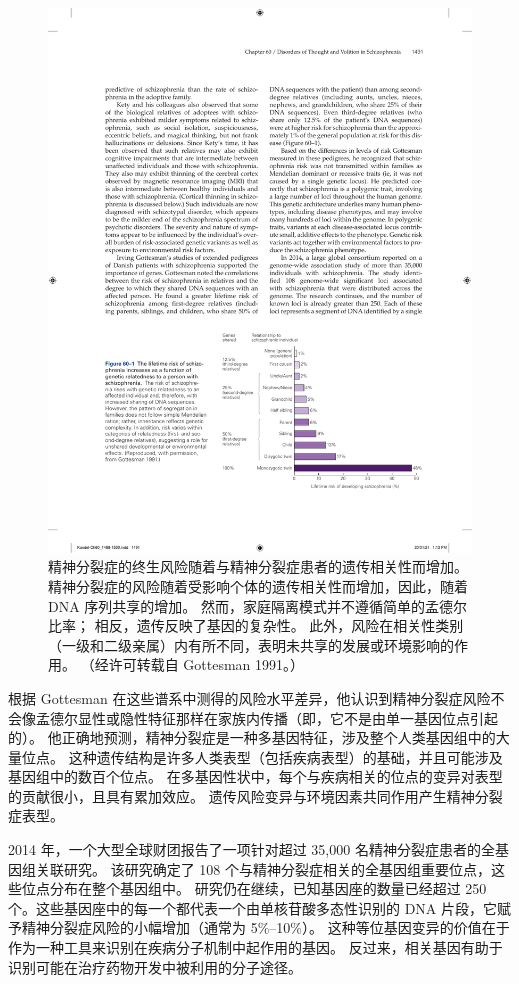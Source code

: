 \begin{figure}[htbp]
	\centering
	\includegraphics[width=0.7\linewidth]{chap60/fig_60_1}
	\caption{精神分裂症的终生风险随着与精神分裂症患者的遗传相关性而增加。 精神分裂症的风险随着受影响个体的遗传相关性而增加，因此，随着 DNA 序列共享的增加。 然而，家庭隔离模式并不遵循简单的孟德尔比率； 相反，遗传反映了基因的复杂性。 此外，风险在相关性类别（一级和二级亲属）内有所不同，表明未共享的发展或环境影响的作用。 （经许可转载自 Gottesman 1991。）}
	\label{fig:60_1}
\end{figure}

根据 Gottesman 在这些谱系中测得的风险水平差异，他认识到精神分裂症风险不会像孟德尔显性或隐性特征那样在家族内传播（即，它不是由单一基因位点引起的）。 他正确地预测，精神分裂症是一种多基因特征，涉及整个人类基因组中的大量位点。 这种遗传结构是许多人类表型（包括疾病表型）的基础，并且可能涉及基因组中的数百个位点。 在多基因性状中，每个与疾病相关的位点的变异对表型的贡献很小，且具有累加效应。 遗传风险变异与环境因素共同作用产生精神分裂症表型。

2014 年，一个大型全球财团报告了一项针对超过 35,000 名精神分裂症患者的全基因组关联研究。 该研究确定了 108 个与精神分裂症相关的全基因组重要位点，这些位点分布在整个基因组中。 研究仍在继续，已知基因座的数量已经超过 250 个。这些基因座中的每一个都代表一个由单核苷酸多态性识别的 DNA 片段，它赋予精神分裂症风险的小幅增加（通常为 5\%–10\%）。 这种等位基因变异的价值在于作为一种工具来识别在疾病分子机制中起作用的基因。 反过来，相关基因有助于识别可能在治疗药物开发中被利用的分子途径。


